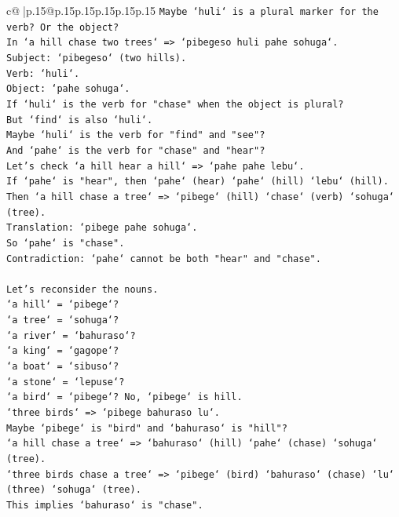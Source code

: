 \documentclass{article}
\begin{document}
{\begin{supertabular}{c@{$\;$}|p{.15\linewidth}@{}p{.15\linewidth}p{.15\linewidth}p{.15\linewidth}p{.15\linewidth}p{.15\linewidth}}
{{{\texttt{Maybe `huli` is a plural marker for the verb? Or the object?} \\
\texttt{In `a hill chase two trees` => `pibegeso huli pahe sohuga`.} \\
\texttt{Subject: `pibegeso` (two hills).} \\
\texttt{Verb: `huli`.} \\
\texttt{Object: `pahe sohuga`.} \\
\texttt{If `huli` is the verb for "chase" when the object is plural?} \\
\texttt{But `find` is also `huli`.} \\
\texttt{Maybe `huli` is the verb for "find" and "see"?} \\
\texttt{And `pahe` is the verb for "chase" and "hear"?} \\
\texttt{Let's check `a hill hear a hill` => `pahe pahe lebu`.} \\
\texttt{If `pahe` is "hear", then `pahe` (hear) `pahe` (hill) `lebu` (hill).} \\
\texttt{Then `a hill chase a tree` => `pibege` (hill) `chase` (verb) `sohuga` (tree).} \\
\texttt{Translation: `pibege pahe sohuga`.} \\
\texttt{So `pahe` is "chase".} \\
\texttt{Contradiction: `pahe` cannot be both "hear" and "chase".} \\
\\ 
\texttt{Let's reconsider the nouns.} \\
\texttt{`a hill` = `pibege`?} \\
\texttt{`a tree` = `sohuga`?} \\
\texttt{`a river` = `bahuraso`?} \\
\texttt{`a king` = `gagope`?} \\
\texttt{`a boat` = `sibuso`?} \\
\texttt{`a stone` = `lepuse`?} \\
\texttt{`a bird` = `pibege`? No, `pibege` is hill.} \\
\texttt{`three birds` => `pibege bahuraso lu`.} \\
\texttt{Maybe `pibege` is "bird" and `bahuraso` is "hill"?} \\
\texttt{`a hill chase a tree` => `bahuraso` (hill) `pahe` (chase) `sohuga` (tree).} \\
\texttt{`three birds chase a tree` => `pibege` (bird) `bahuraso` (chase) `lu` (three) `sohuga` (tree).} \\
\texttt{This implies `bahuraso` is "chase".} \\
}}}
\end{supertabular}}
\end{document}
